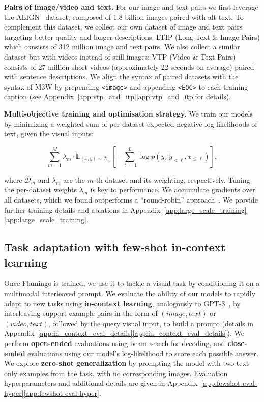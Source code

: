 \textbf{Pairs of image/video and text.} For our image and text pairs we first leverage the ALIGN~\citep{align} dataset, composed of 1.8 billion images paired with alt-text. To complement this dataset,  we collect our own dataset of image and text pairs targeting better quality and longer descriptions:  LTIP (Long Text \& Image Pairs) which consists of 312 million image and text pairs. We also collect a similar dataset but with videos instead of still images: VTP (Video \& Text Pairs) consists of 27 million short videos (approximately 22 seconds on average) paired with sentence descriptions. We align the syntax of paired datasets with the syntax of M3W by prepending \texttt{<image>} and appending \texttt{<EOC>} to each training caption (see Appendix~\ifwithappendix\ref{app:vtp_and_itp}\else\ref*{app:vtp_and_itp}\fi for details).

\textbf{Multi-objective training and optimisation strategy.} We train our models by minimizing a weighted sum of per-dataset expected negative log-likelihoods of text, given the visual inputs:

\begin{equation}
    \sum_{m=1}^{M} \lambda_m \cdot \mathbb{E}_{(x, y)\sim \mathcal{D}_m} \left[ -\sum_{\ell=1}^L \log p(y_\ell | y_{< \ell}, x_{\leq \ell})\right],
\end{equation}

where $\mathcal{D}_m$ and $\lambda_m$ are the $m$-th dataset and its weighting, respectively. Tuning the per-dataset weights $\lambda_m$ is key to performance. We accumulate gradients over all datasets, which we found outperforms a ``round-robin'' approach~\citep{cho2021unifying}. We provide further training details and ablations in Appendix~\ifwithappendix\ref{app:large_scale_training}\else\ref*{app:large_scale_training}\fi.

\subsection{Task adaptation with few-shot in-context learning}
\label{sec:adapt-vlm}

Once Flamingo is trained, we use it to tackle a visual task by conditioning it on a multimodal interleaved prompt. We evaluate the ability of our models to rapidly adapt to new tasks using \textbf{in-context learning}, analogously to GPT-3~\citep{gpt3}, by interleaving support example pairs in the form of $(image, text)$ or $(video, text)$, followed by the query visual input, to build a prompt (details in Appendix~\ifwithappendix\ref{app:in_context_eval_details}\else\ref*{app:in_context_eval_details}\fi).
We perform \textbf{open-ended} evaluations using beam search for decoding, and \textbf{close-ended} evaluations using our model's log-likelihood to score each possible answer. We explore \textbf{zero-shot generalization} by prompting the model with two text-only examples from the task, with no corresponding images. Evaluation hyperparameters and additional details are given in Appendix~\ifwithappendix\ref{app:fewshot-eval-hyper}\else\ref*{app:fewshot-eval-hyper}\fi.

